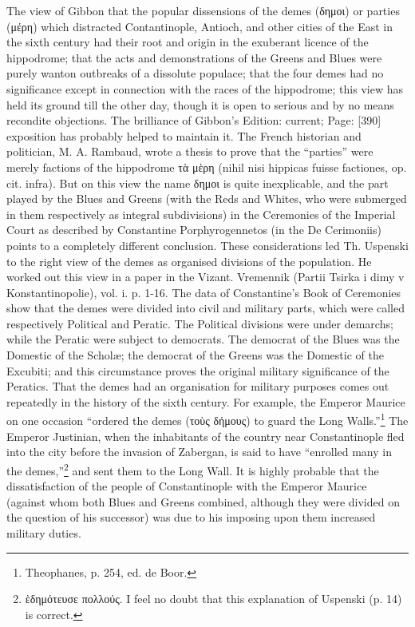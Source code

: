 The view of Gibbon that the popular dissensions of the demes (\textgreek{δημοι}) or parties (\textgreek{μέρη}) which distracted Contantinople, Antioch, and other cities of the East in the sixth century had their root and origin in the exuberant licence of the hippodrome; that the acts and demonstrations of the Greens and Blues were purely wanton outbreaks of a dissolute populace; that the four demes had no significance except in connection with the races of the hippodrome; this view has held its ground till the other day, though it is open to serious and by no means recondite objections. The brilliance of Gibbon\texthebrew{}’s Edition: current; Page: [390] exposition has probably helped to maintain it. The French historian and politician, M. A. Rambaud, wrote a thesis to prove that the \texthebrew{“}parties\texthebrew{}” were merely factions of the hippodrome \textgreek{τ\texthebrew{ὰ} μ\texthebrew{ἑ}ρη} (nihil nisi hippicas fuisse factiones, op. cit. infra). But on this view the name \textgreek{δημοι} is quite inexplicable, and the part played by the Blues and Greens (with the Reds and Whites, who were submerged in them respectively as integral subdivisions) in the Ceremonies of the Imperial Court as described by Constantine Porphyrogennetos (in the De Cerimoniis) points to a completely different conclusion. These considerations led Th. Uspenski to the right view of the demes as organised divisions of the population. He worked out this view in a paper in the Vizant. Vremennik (Partii Tsirka i dimy v Konstantinopolie), vol. i. p. 1-16. The data of Constantine\texthebrew{}’s Book of Ceremonies show that the demes were divided into civil and military parts, which were called respectively Political and Peratic. The Political divisions were under demarchs; while the Peratic were subject to democrats. The democrat of the Blues was the Domestic of the Scholæ; the democrat of the Greens was the Domestic of the Excubiti; and this circumstance proves the original military significance of the Peratics. That the demes had an organisation for military purposes comes out repeatedly in the history of the sixth century. For example, the Emperor Maurice on one occasion \texthebrew{“}ordered the demes (\textgreek{το\texthebrew{ὺ}ς δήμους}) to guard the Long Walls.\texthebrew{}”\footnote{Theophanes, p. 254, ed. de Boor.} The Emperor Justinian, when the inhabitants of the country near Constantinople fled into the city before the invasion of Zabergan, is said to have \texthebrew{“}enrolled many in the demes,\texthebrew{}”\footnote{\textgreek{\texthebrew{ὲ}δημότευσε πολλούς}. I feel no doubt that this explanation of Uspenski (p. 14) is correct.} and sent them to the Long Wall. It is highly probable that the dissatisfaction of the people of Constantinople with the Emperor Maurice (against whom both Blues and Greens combined, although they were divided on the question of his successor) was due to his imposing upon them increased military duties.

